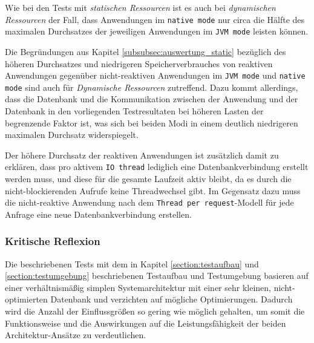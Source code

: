 Wie bei den Tests mit \textit{statischen Ressourcen} ist es auch bei \textit{dynamischen Ressourcen} der Fall, dass Anwendungen im
\verb|native mode| nur circa die Hälfte des maximalen Durchsatzes der jeweiligen Anwendungen im \verb|JVM mode| leisten können.

Die Begründungen aus Kapitel \ref{subsubsec:auswertung_static} bezüglich des höheren Durchsatzes und niedrigeren Speicherverbrauches
von reaktiven Anwendungen gegenüber nicht-reaktiven Anwendungen im \verb|JVM mode| und \verb|native mode| sind auch für
\textit{Dynamische Ressourcen} zutreffend.
Dazu kommt allerdings, dass die Datenbank und die Kommunikation zwischen der Anwendung und der Datenbank in den vorliegenden Testresultaten
bei höheren Lasten der begrenzende Faktor ist, was sich bei beiden Modi in einem deutlich niedrigeren maximalen Durchsatz widerspiegelt.

Der höhere Durchsatz der reaktiven Anwendungen ist zusätzlich damit zu erklären, dass pro aktivem \verb|IO thread| lediglich eine
Datenbankverbindung erstellt werden muss, und diese für die gesamte Laufzeit aktiv bleibt, da es durch die nicht-blockierenden
Aufrufe keine Threadwechsel gibt. Im Gegensatz dazu muss die nicht-reaktive Anwendung nach dem \verb|Thread per request|-Modell
für jede Anfrage eine neue Datenbankverbindung erstellen.
\newpage

\subsubsection{Kritische Reflexion}
\label{subsubsec:auswertung_kritische_reflexion}
Die beschriebenen Tests mit dem in Kapitel \ref{section:testaufbau} und \ref{section:testumgebung} beschriebenen Testaufbau und Testumgebung
basieren auf einer verhältnismäßig simplen Systemarchitektur mit einer sehr kleinen, nicht-optimierten Datenbank und verzichten auf mögliche Optimierungen.
Dadurch wird die Anzahl der Einflussgrößen so gering wie möglich gehalten, um somit die Funktionsweise und die
Auswirkungen auf die Leistungsfähigkeit der beiden Architektur-Ansätze zu verdeutlichen.

